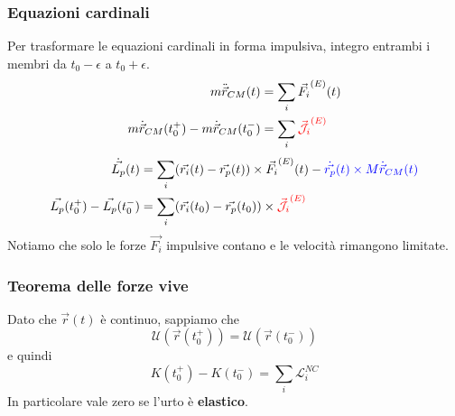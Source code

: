 \subsubsection{Equazioni cardinali}
Per trasformare le equazioni cardinali in forma impulsiva, integro entrambi i membri da $t_0-\epsilon$ a $t_0+\epsilon$.
\begin{equation}
	\begin{split}
		m\ddot{\vec{r}}_{CM}(t) & = \sum_i \vec{F_i}^{(E)}(t) \\
		m\dot{\vec{r}}_{CM}(t_0^+) - m\dot{\vec{r}}_{CM}(t_0^-) & = \sum_i\color{red}\vec{\mathcal{J}_i}^{(E)}\color{black}
	\end{split}
\end{equation}
\begin{equation}
	\begin{split}
		\dot{\vec{L_p}}(t) & = \sum_i (\vec{r_i}(t) - \vec{r_p}(t)) \times \vec{F_i}^{(E)}(t)-\color{blue}\dot{\vec{r_p}}(t) \times M \dot{\vec{r}}_{CM}(t)\color{black} \\
		\vec{L_p}(t_0^+)-\vec{L_p}(t_0^-) & = \sum_i (\vec{r_i}(t_0)-\vec{r_p}(t_0)) \times \color{red}\vec{\mathcal{J}_i}^{(E)}\color{black}
	\end{split}
\end{equation}
Notiamo che solo le \color{red}forze \color{black} $\vec{F_i}$ impulsive contano e le \color{blue}velocità \color{black} rimangono limitate.

\subsubsection{Teorema  delle forze vive}
Dato che $\vec{r}(t)$ è continuo, sappiamo che
\begin{equation*}
	\mathcal{U}(\vec{r}(t_0^+)) = \mathcal{U}(\vec{r}(t_0^-))
\end{equation*}
e quindi
\begin{equation}
	K(t_0^+) - K(t_0^-) = \sum_i \mathcal{L}_i^{NC}
\end{equation}
In particolare vale zero se l'urto è \textbf{elastico}.

